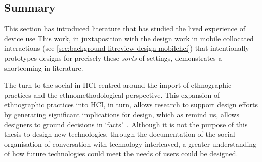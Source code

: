 \subsection{Summary}\label{sec:background technology vivo summary}
This section has introduced literature that has studied the lived experience of device use 
This work, in juxtaposition with the design work in mobile collocated interactions (see \ref{sec:background litreview design mobilehci}) that intentionally prototypes designs for precisely these \textit{sorts} of settings, demonstrates a shortcoming in literature.

\begin{revisedsubmission}
The turn to the social in \ac{HCI} centred around the import of ethnographic practices and the ethnomethodological perspective.
This expansion of ethnographic practices into \ac{HCI}, in turn, allows research to support design efforts by generating significant implications for design, which as \citet{Crabtree2012} remind us, allows designers to ground decisions in `facts'~\citep[p. 137]{Crabtree2012}.
Although it is not the purpose of this thesis to design new technologies, through the documentation of the social organisation of conversation with technology interleaved, a greater understanding of how future technologies could meet the needs of users could be designed.
\end{revisedsubmission}


